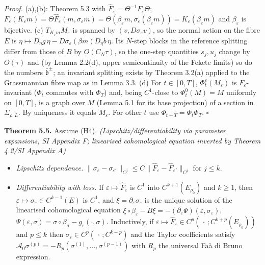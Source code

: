 \documentclass[11pt,a4paper]{article}
\theoremstyle{plain}
\theoremstyle{definition}
\theoremstyle{remark}
\numberwithin{equation}{section}
\numberwithin{figure}{section}
\begin{document}
\textit{Proof.} (a),(b): Theorem 5.3 with $\widehat F_\varepsilon=\Theta^{-1}F_\varepsilon\Theta$; $F_\varepsilon(K_\varepsilon m)=\Theta\widehat F_\varepsilon(m,\sigma_\varepsilon m)=\Theta(\beta_\varepsilon m,\sigma_\varepsilon(\beta_\varepsilon m))=K_\varepsilon(\beta_\varepsilon m)$ and $\beta_\varepsilon$ is bijective. (c) $T_{K_\varepsilon m}M_\varepsilon$ is spanned by $(v,D\sigma_\varepsilon v)$, so the normal action on the fibre $E$ is $\eta\mapsto D_\eta g\,\eta-D\sigma_\varepsilon(\beta m)D_\eta b\,\eta$. Its $N$-step blocks in the reference splitting differ from those of $B$ by $O(C_N\tau)$, so the one-step quantities $s_j,u_j$ change by $O(\tau)$ and (by Lemma 2.2(d), upper semicontinuity of the Fekete limits) so do the numbers $\bar{\mathfrak b}^\pm$; an invariant splitting exists by Theorem 3.2(a) applied to the Grassmannian fibre map as in Lemma 3.3. (d) For $t\in[0,T]$, $\Phi^\varepsilon_t(M_\varepsilon)$ is $F_\varepsilon$-invariant ($\Phi_t$ commutes with $\Phi_T$) and, being $C^1$-close to $\Phi^0_t(M)=M$ uniformly on $[0,T]$, is a graph over $M$ (Lemma 5.1 for its base projection) of a section in $\Sigma_{\rho,L}$. By uniqueness it equals $M_\varepsilon$. For other $t$ use $\Phi_{t+T}=\Phi_t\Phi_T$. $\square$

\textbf{Theorem 5.5.} Assume (H4). \textit{(Lipschitz/differentiability via parameter expansions, SI Appendix F; linearised cohomological equation inverted by Theorem 4.2/SI Appendix A)}
\begin{itemize}
    \item[(a)] \textit{Lipschitz dependence.} $\|\sigma_\varepsilon-\sigma_{\varepsilon'}\|_{C^j}\le C\|\widehat F_\varepsilon-\widehat F_{\varepsilon'}\|_{C^j}$ for $j\le k$.
    \item[(b)] \textit{Differentiability with loss.} If $\varepsilon\mapsto\widehat F_\varepsilon$ is $C^1$ into $C^{k+1}(E_{\rho_0})$ and $k\ge1$, then $\varepsilon\mapsto\sigma_\varepsilon\in C^{k-1}(E)$ is $C^1$, and $\xi=\partial_\varepsilon\sigma_\varepsilon$ is the unique solution of the linearised cohomological equation $\xi\circ\beta_\varepsilon-\tilde B\xi=-(\partial_\varepsilon\Psi)(\varepsilon,\sigma_\varepsilon)$, $\Psi(\varepsilon,\sigma)=\sigma\circ\beta_\sigma-g_\varepsilon(\cdot,\sigma)$. Inductively, if $\varepsilon\mapsto\widehat F_\varepsilon\in C^p(\,\cdot\,;C^{k+p}(E_{\rho_0}))$ and $p\le k$ then $\sigma_\varepsilon\in C^p(\,\cdot\,;C^{k-p})$ and the Taylor coefficients satisfy $\mathcal A_0\sigma^{(p)}=-R_p(\sigma^{(1)},\dots,\sigma^{(p-1)})$ with $R_p$ the universal Faà di Bruno expression.
\end{itemize}
\end{document}
